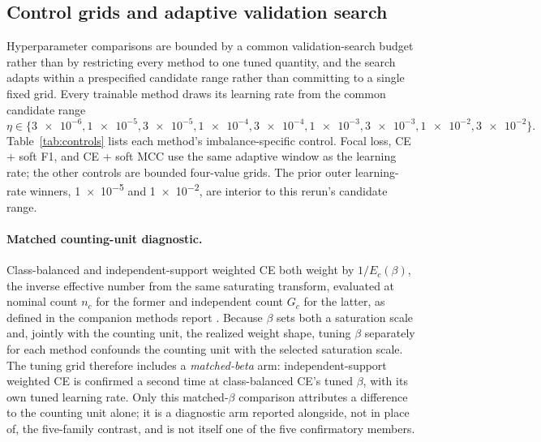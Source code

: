 \documentclass[11pt]{article}
\begin{document}
\subsection{Control grids and adaptive validation search}
\label{app:controls}
Hyperparameter comparisons are bounded by a common validation-search budget rather than by restricting every method to one tuned quantity, and the search adapts within a prespecified candidate range rather than committing to a single fixed grid. Every trainable method draws its learning rate from the common candidate range
\begin{equation}
  \eta\in\{\num{3e-6},\num{1e-5},\num{3e-5},\num{1e-4},\num{3e-4},\num{1e-3},\num{3e-3},\num{1e-2},\num{3e-2}\}.
  \label{eq:learning-rate-grid}
\end{equation}
\noindent Table~\ref{tab:controls} lists each method's imbalance-specific control. Focal loss, CE + soft F1, and CE + soft MCC use the same adaptive window as the learning rate; the other controls are bounded four-value grids. The prior outer learning-rate winners, \num{1e-5} and \num{1e-2}, are interior to this rerun's candidate range.

\paragraph{Matched counting-unit diagnostic.}
Class-balanced and independent-support weighted CE both weight by $1/E_c(\beta)$, the inverse effective number from the same saturating transform, evaluated at nominal count $n_c$ for the former and independent count $G_c$ for the latter, as defined in the companion methods report \citep{queisler2026imbalanceMethods}. Because $\beta$ sets both a saturation scale and, jointly with the counting unit, the realized weight shape, tuning $\beta$ separately for each method confounds the counting unit with the selected saturation scale. The tuning grid therefore includes a \emph{matched-beta} arm: independent-support weighted CE is confirmed a second time at class-balanced CE's tuned $\beta$, with its own tuned learning rate. Only this matched-$\beta$ comparison attributes a difference to the counting unit alone; it is a diagnostic arm reported alongside, not in place of, the five-family contrast, and is not itself one of the five confirmatory members.
\end{document}
